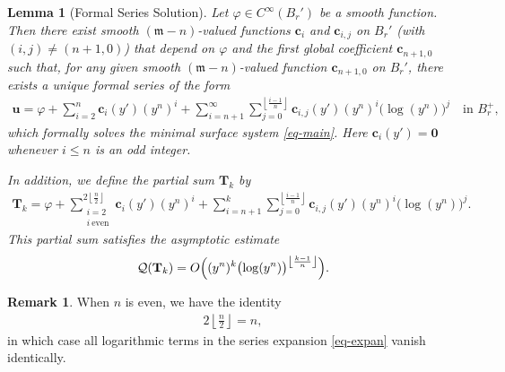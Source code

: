 \documentclass[11pt,reqno]{amsart}
\newcommand{\fm}{\mathfrak{m}}
\renewcommand{\leq}{\leqslant}
\newtheorem{lemma}[theorem]{Lemma}
\theoremstyle{definition}
\newtheorem{remark}[theorem]{Remark}
\numberwithin{equation}{section}
\begin{document}
\begin{lemma}[Formal Series Solution]\label{lem-Form-Comp}
    Let $\varphi \in C^\infty(B_r')$ be a smooth function. Then there exist smooth $(\fm-n)$-valued functions $\mathbf{c}_i$ and $\mathbf{c}_{i,j}$ on $B_r'$ (with $(i,j)\neq (n+1,0)$) that depend on $\varphi$ and the first global coefficient $\mathbf{c}_{n+1,0}$ such that, for any given smooth $(\fm-n)$-valued function $\mathbf{c}_{n+1,0}$ on $B_r'$, there exists a unique formal series of the form
    \begin{align}\label{eq-expan}
        \mathbf{u} = \varphi +\sum_{i=2}^{n}\mathbf{c}_i(y')(y^n)^i +\sum_{i=n+1}^\infty \sum_{j=0}^{\left\lfloor \frac{i-1}{n}\right\rfloor} \mathbf{c}_{i,j}(y')(y^n)^i\bigl(\log (y^n)\bigr)^j \quad \text{in } B^+_r,
    \end{align}
    which formally solves the minimal surface system \eqref{eq-main}. Here  $\mathbf{c}_i(y')=\mathbf{0}$ whenever $i\leq n$ is an odd integer.

    In addition, we define the partial sum $\mathbf{T}_k$ by
    \begin{align}\label{eq-uk}
        \mathbf{T}_k = \varphi +\sum_{\substack{i=2 \\ i\ \text{even}}}^{2\left\lfloor \frac{n}{2}\right\rfloor}\mathbf{c}_i(y') (y^n)^i +\sum_{i=n+1}^k\sum_{j=0}^{\left\lfloor \frac{i-1}{n}\right\rfloor} \mathbf{c}_{i,j}(y') (y^n)^i\bigl(\log (y^n)\bigr)^j.
    \end{align}
    This partial sum satisfies the asymptotic estimate
    \begin{align}
        \mathcal{Q}(\mathbf{T}_k)=O\Bigl((y^n)^{k}\bigl(\log (y^n)\bigr)^{\left\lfloor \frac{k-1}{n}\right\rfloor}\Bigr).
    \end{align}
\end{lemma}

\begin{remark}
    When $n$ is even, we have the identity
    \begin{align}
        2\left\lfloor \frac{n}{2}\right\rfloor =n,
    \end{align}
    in which case all logarithmic terms in the series expansion \eqref{eq-expan} vanish identically.
\end{remark}
\end{document}
